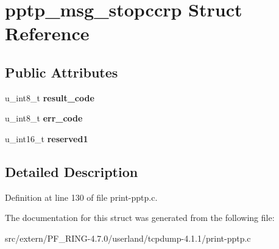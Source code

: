 \hypertarget{structpptp__msg__stopccrp}{
\section{pptp\_\-msg\_\-stopccrp Struct Reference}
\label{structpptp__msg__stopccrp}
}
\subsection*{Public Attributes}
\begin{DoxyCompactItemize}
\item 
\hypertarget{structpptp__msg__stopccrp_a6405697effe299e8309e14315e95e458}{
u\_\-int8\_\-t {\bfseries result\_\-code}}
\label{structpptp__msg__stopccrp_a6405697effe299e8309e14315e95e458}

\item 
\hypertarget{structpptp__msg__stopccrp_a619a3be5fbdbaa9b8fe4d3e1be2c9e98}{
u\_\-int8\_\-t {\bfseries err\_\-code}}
\label{structpptp__msg__stopccrp_a619a3be5fbdbaa9b8fe4d3e1be2c9e98}

\item 
\hypertarget{structpptp__msg__stopccrp_a40c7a68ca3ff8da7699e3e24f84c39e1}{
u\_\-int16\_\-t {\bfseries reserved1}}
\label{structpptp__msg__stopccrp_a40c7a68ca3ff8da7699e3e24f84c39e1}

\end{DoxyCompactItemize}


\subsection{Detailed Description}


Definition at line 130 of file print-\/pptp.c.



The documentation for this struct was generated from the following file:\begin{DoxyCompactItemize}
\item 
src/extern/PF\_\-RING-\/4.7.0/userland/tcpdump-\/4.1.1/print-\/pptp.c\end{DoxyCompactItemize}

